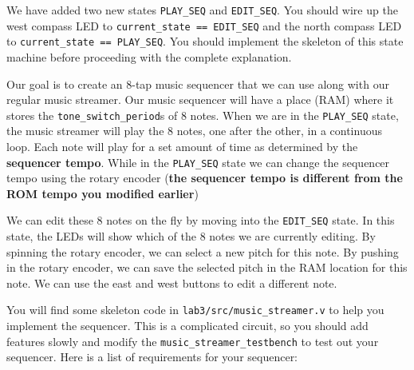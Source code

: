 \documentclass[11pt]{article}
\begin{document}
We have added two new states \verb|PLAY_SEQ| and \verb|EDIT_SEQ|. You should wire up the west compass LED to \verb|current_state == EDIT_SEQ| and the north compass LED to \verb|current_state == PLAY_SEQ|. You should implement the skeleton of this state machine before proceeding with the complete explanation.

Our goal is to create an 8-tap music sequencer that we can use along with our regular music streamer. Our music sequencer will have a place (RAM) where it stores the \verb|tone_switch_period|s of 8 notes. When we are in the \verb|PLAY_SEQ| state, the music streamer will play the 8 notes, one after the other, in a continuous loop. Each note will play for a set amount of time as determined by the \textbf{sequencer tempo}. While in the \verb|PLAY_SEQ| state we can change the sequencer tempo using the rotary encoder (\textbf{the sequencer tempo is different from the ROM tempo you modified earlier})

We can edit these 8 notes on the fly by moving into the \verb|EDIT_SEQ| state. In this state, the LEDs will show which of the 8 notes we are currently editing. By spinning the rotary encoder, we can select a new pitch for this note. By pushing in the rotary encoder, we can save the selected pitch in the RAM location for this note. We can use the east and west buttons to edit a different note.

You will find some skeleton code in \verb|lab3/src/music_streamer.v| to help you implement the sequencer. This is a complicated circuit, so you should add features slowly and modify the \verb|music_streamer_testbench| to test out your sequencer. Here is a list of requirements for your sequencer:
\end{document}
